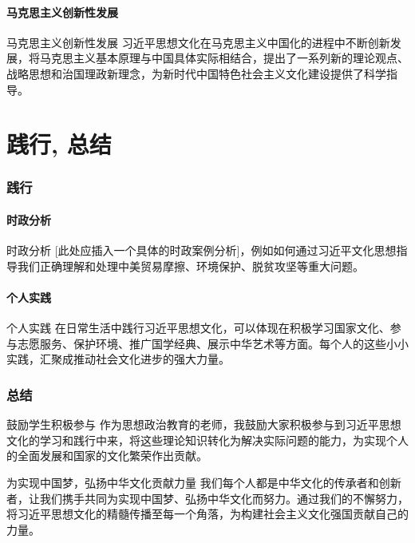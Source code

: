 \documentclass[xcolor=table,dvipsnames,svgnames,aspectratio=169]{ctexbeamer}
\begin{document}
\subsection{马克思主义创新性发展}
\begin{frame}{马克思主义创新性发展}
  习近平思想文化在马克思主义中国化的进程中不断创新发展，将马克思主义基本原理与中国具体实际相结合，提出了一系列新的理论观点、战略思想和治国理政新理念，为新时代中国特色社会主义文化建设提供了科学指导。
\end{frame}


\part{践行, 总结}
\section{践行}
\subsection{时政分析}
\begin{frame}{时政分析}
  [此处应插入一个具体的时政案例分析]，例如如何通过习近平文化思想指导我们正确理解和处理中美贸易摩擦、环境保护、脱贫攻坚等重大问题。
\end{frame}

\subsection{个人实践}
\begin{frame}{个人实践}
  在日常生活中践行习近平思想文化，可以体现在积极学习国家文化、参与志愿服务、保护环境、推广国学经典、展示中华艺术等方面。每个人的这些小小实践，汇聚成推动社会文化进步的强大力量。
\end{frame}


\section{总结}
\begin{frame}{鼓励学生积极参与}
  作为思想政治教育的老师，我鼓励大家积极参与到习近平思想文化的学习和践行中来，将这些理论知识转化为解决实际问题的能力，为实现个人的全面发展和国家的文化繁荣作出贡献。
\end{frame}

\begin{frame}{为实现中国梦，弘扬中华文化贡献力量}
  我们每个人都是中华文化的传承者和创新者，让我们携手共同为实现中国梦、弘扬中华文化而努力。通过我们的不懈努力，将习近平思想文化的精髓传播至每一个角落，为构建社会主义文化强国贡献自己的力量。
\end{frame}

\makebottom
\end{document}
